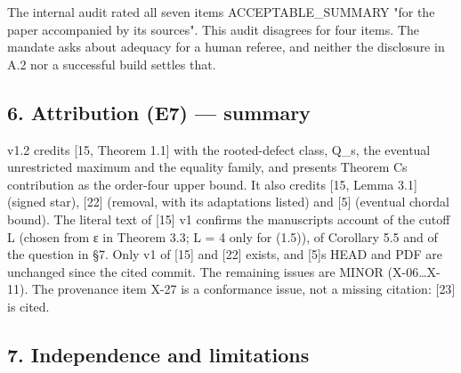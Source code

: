 \documentclass[
]{article}
\begin{document}
The internal audit rated all seven items ACCEPTABLE\_SUMMARY "for the
paper accompanied by its sources". This audit disagrees for four items.
The mandate asks about adequacy for a human referee, and neither the
disclosure in A.2 nor a successful build settles that.

\subsection{6. Attribution (E7) ---
summary}\label{6-attribution-e7--summary}

v1.2 credits {[}15, Theorem 1.1{]} with the rooted-defect class, Q\_s,
the eventual unrestricted maximum and the equality family, and presents
Theorem C\textquotesingle s contribution as the order-four upper bound.
It also credits {[}15, Lemma 3.1{]} (signed star), {[}22{]} (removal,
with its adaptations listed) and {[}5{]} (eventual chordal bound). The
literal text of {[}15{]} v1 confirms the manuscript\textquotesingle s
account of the cutoff L (chosen from ε in Theorem 3.3; L = 4 only for
(1.5)), of Corollary 5.5 and of the question in §7. Only v1 of {[}15{]}
and {[}22{]} exists, and {[}5{]}\textquotesingle s HEAD and PDF are
unchanged since the cited commit. The remaining issues are MINOR
(X-06\ldots X-11). The provenance item X-27 is a conformance issue, not
a missing citation: {[}23{]} is cited.

\subsection{7. Independence and
limitations}\label{7-independence-and-limitations}
\end{document}
